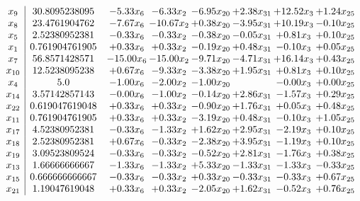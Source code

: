 \documentclass[8pt]{article}
\begin{document}
\[\begin{array}{c| c c@{\hskip 2pt} c@{\hskip 2pt} c@{\hskip 2pt} c@{\hskip 2pt} c@{\hskip 2pt} c@{\hskip 2pt} }
 x_{9}   &  30.8095238095 & -5.33 x_{6} & -6.33 x_{2} & -6.95 x_{20} & +  2.38 x_{31} & + 12.52 x_{3} & +  1.24 x_{25}\\
 x_{8}   &  23.4761904762 & -7.67 x_{6} & -10.67 x_{2} & +  0.38 x_{20} & -3.95 x_{31} & + 10.19 x_{3} & -0.10 x_{25}\\
 x_{5}   &  2.52380952381 & -0.33 x_{6} & -0.33 x_{2} & -0.38 x_{20} & -0.05 x_{31} & +  0.81 x_{3} & +  0.10 x_{25}\\
 x_{1}   &  0.761904761905 & +  0.33 x_{6} & +  0.33 x_{2} & -0.19 x_{20} & +  0.48 x_{31} & -0.10 x_{3} & +  0.05 x_{25}\\
 x_{7}   &  56.8571428571 & -15.00 x_{6} & -15.00 x_{2} & -9.71 x_{20} & -4.71 x_{31} & + 16.14 x_{3} & +  0.43 x_{25}\\
 x_{10}   &  12.5238095238 & +  0.67 x_{6} & -9.33 x_{2} & -3.38 x_{20} & +  1.95 x_{31} & +  0.81 x_{3} & +  0.10 x_{25}\\
 x_{4}   &  5.0 & -1.00 x_{6} & -2.00 x_{2} & -1.00 x_{20} &   & -0.00 x_{3} & +  0.00 x_{25}\\
 x_{14}   &  3.57142857143 & -0.00 x_{6} & -1.00 x_{2} & -0.14 x_{20} & +  2.86 x_{31} & -1.57 x_{3} & +  0.29 x_{25}\\
 x_{22}   &  0.619047619048 & +  0.33 x_{6} & +  0.33 x_{2} & -0.90 x_{20} & +  1.76 x_{31} & +  0.05 x_{3} & +  0.48 x_{25}\\
 x_{11}   &  0.761904761905 & +  0.33 x_{6} & +  0.33 x_{2} & -3.19 x_{20} & +  0.48 x_{31} & -0.10 x_{3} & +  1.05 x_{25}\\
 x_{17}   &  4.52380952381 & -0.33 x_{6} & -1.33 x_{2} & +  1.62 x_{20} & +  2.95 x_{31} & -2.19 x_{3} & +  0.10 x_{25}\\
 x_{18}   &  2.52380952381 & +  0.67 x_{6} & -0.33 x_{2} & -2.38 x_{20} & +  3.95 x_{31} & -1.19 x_{3} & +  0.10 x_{25}\\
 x_{19}   &  3.09523809524 & -0.33 x_{6} & -0.33 x_{2} & -0.52 x_{20} & +  2.81 x_{31} & -1.76 x_{3} & +  0.38 x_{25}\\
 x_{13}   &  1.66666666667 & -1.33 x_{6} & -1.33 x_{2} & +  5.33 x_{20} & -1.33 x_{31} & -1.33 x_{3} & -0.33 x_{25}\\
 x_{15}   &  0.666666666667 & -0.33 x_{6} & -0.33 x_{2} & +  0.33 x_{20} & -0.33 x_{31} & -0.33 x_{3} & +  0.67 x_{25}\\
 x_{21}   &  1.19047619048 & +  0.33 x_{6} & +  0.33 x_{2} & -2.05 x_{20} & +  1.62 x_{31} & -0.52 x_{3} & +  0.76 x_{25}\\

\end{array}\]
\end{document}

